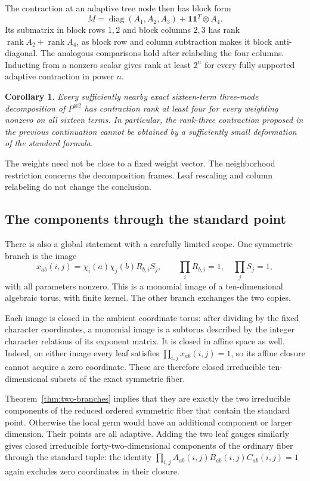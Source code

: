 \documentclass[11pt]{article}
\newtheorem{corollary}[theorem]{Corollary}
\theoremstyle{definition}\newtheorem{definition}[theorem]{Definition}
\newcommand{\rank}{\operatorname{rank}}
\newcommand{\diag}{\operatorname{diag}}
\newcommand{\one}{\mathbf 1}
\begin{document}
The contraction at an adaptive tree node then has block form
\begin{equation}\label{eq:block}
M=\diag(A_1,A_2,A_3)+\one\one^T\otimes A_4.
\end{equation}
Its submatrix in block rows $1,2$ and block columns $2,3$ has rank $\rank A_2+\rank A_4$, as block row and column subtraction makes it block anti-diagonal. The analogous comparisons hold after relabeling the four columns. Inducting from a nonzero scalar gives rank at least $2^n$ for every fully supported adaptive contraction in power $n$.

\begin{corollary}\label{cor:local-rank3}
Every sufficiently nearby exact sixteen-term three-mode decomposition of $P^{\otimes2}$ has contraction rank at least four for every weighting nonzero on all sixteen terms. In particular, the rank-three contraction proposed in the previous continuation cannot be obtained by a sufficiently small deformation of the standard formula.
\end{corollary}
The weights need not be close to a fixed weight vector. The neighborhood restriction concerns the decomposition frames. Leaf rescaling and column relabeling do not change the conclusion.

\subsection{The components through the standard point}
There is also a global statement with a carefully limited scope. One symmetric branch is the image
\begin{equation}\label{eq:torus}
x_{ab}(i,j)=\chi_i(a)\chi_j(b)R_{b,i}S_j,
\qquad \prod_iR_{b,i}=1,\quad\prod_jS_j=1,
\end{equation}
with all parameters nonzero. This is a monomial image of a ten-dimensional algebraic torus, with finite kernel. The other branch exchanges the two copies.

Each image is closed in the ambient coordinate torus: after dividing by the fixed character coordinates, a monomial image is a subtorus described by the integer character relations of its exponent matrix. It is closed in affine space as well. Indeed, on either image every leaf satisfies $\prod_{i,j}x_{ab}(i,j)=1$, so its affine closure cannot acquire a zero coordinate. These are therefore closed irreducible ten-dimensional subsets of the exact symmetric fiber.

Theorem~\ref{thm:two-branches} implies that they are exactly the two irreducible components of the reduced ordered symmetric fiber that contain the standard point. Otherwise the local germ would have an additional component or larger dimension. Their points are all adaptive. Adding the two leaf gauges similarly gives closed irreducible forty-two-dimensional components of the ordinary fiber through the standard tuple: the identity $\prod_{i,j}A_{ab}(i,j)B_{ab}(i,j)C_{ab}(i,j)=1$ again excludes zero coordinates in their closure.
\end{document}
